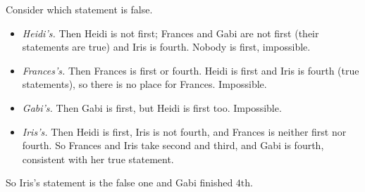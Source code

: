 Consider which statement is false.
\begin{itemize}
\item \emph{Heidi's.} Then Heidi is not first; Frances and Gabi are not first (their statements are true) and Iris is fourth. Nobody is first, impossible.
\item \emph{Frances's.} Then Frances is first or fourth. Heidi is first and Iris is fourth (true statements), so there is no place for Frances. Impossible.
\item \emph{Gabi's.} Then Gabi is first, but Heidi is first too. Impossible.
\item \emph{Iris's.} Then Heidi is first, Iris is not fourth, and Frances is neither first nor fourth. So Frances and Iris take second and third, and Gabi is fourth, consistent with her true statement.
\end{itemize}
So Iris's statement is the false one and Gabi finished $\boxed{4\text{th}}$.
